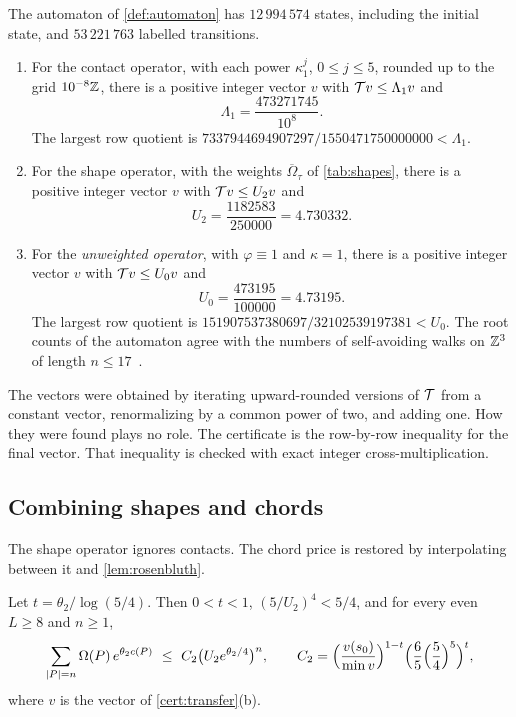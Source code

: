 \begin{certificate}\label{cert:transfer}
The automaton of \cref{def:automaton} has $12\,994\,574$ states, including the initial state, and $53\,221\,763$ labelled transitions.
\begin{enumerate}[label=\textup{(\alph*)}]
\item For the contact operator, with each power $\kappa_1^j$, $0\le j\le5$, rounded up to the grid $10^{-8}\mathbb Z$, there is a positive integer vector $v$ with $\mathcal T v\le\Lambda_1v$ and
\[
 \Lambda_1=\frac{473271745}{10^8}.
\]
The largest row quotient is $7337944694907297/1550471750000000<\Lambda_1$.
\item For the shape operator, with the weights $\overline\Omega_\tau$ of \cref{tab:shapes}, there is a positive integer vector $v$ with $\mathcal T v\le U_2v$ and
\[
 U_2=\frac{1182583}{250000}=4.730332 .
\]
\item For the \emph{unweighted operator}, with $\varphi\equiv1$ and $\kappa=1$, there is a positive integer vector $v$ with $\mathcal T v\le U_0v$ and
\[
 U_0=\frac{473195}{100000}=4.73195 .
\]
The largest row quotient is $151907537380697/32102539197381<U_0$. The root counts of the automaton agree with the numbers of self-avoiding walks on $\mathbb Z^3$ of length $n\le17$~\cite{SBB11}.
\end{enumerate}
\end{certificate}

The vectors were obtained by iterating upward-rounded versions of $\mathcal T$ from a constant vector, renormalizing by a common power of two, and adding one. How they were found plays no role. The certificate is the row-by-row inequality for the final vector. That inequality is checked with exact integer cross-multiplication.

\subsection{Combining shapes and chords}

The shape operator ignores contacts. The chord price is restored by interpolating between it and \cref{lem:rosenbluth}.

\begin{lemma}\label{lem:holder}
Let $t=\theta_2/\log(5/4)$. Then $0<t<1$, $(5/U_2)^4<5/4$, and for every even $L\ge8$ and $n\ge1$,
\[
 \sum_{|P|=n}\Omega(P)\,e^{\theta_2c(P)}\ \le\ C_2\bigl(U_2e^{\theta_2/4}\bigr)^n,
 \qquad C_2=\Bigl(\frac{v(s_0)}{\min v}\Bigr)^{1-t}\Bigl(\frac65\Bigl(\frac54\Bigr)^5\Bigr)^t,
\]
where $v$ is the vector of \cref{cert:transfer}\textup{(b)}.
\end{lemma}

